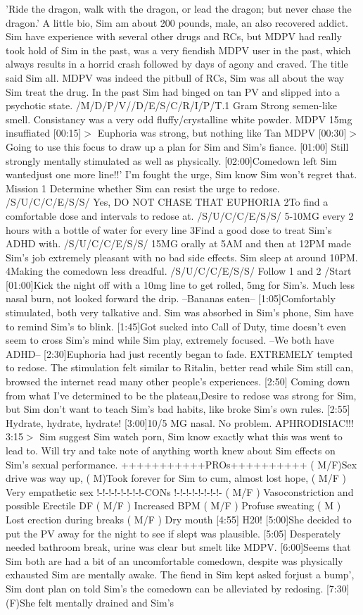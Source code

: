 \documentclass[12pt]{book}
\begin{document}
'Ride the dragon, walk with the dragon, or lead the dragon; but never chase the dragon.' A little bio, Sim am about 200 pounds, male, an also recovered addict. Sim have experience with several other drugs and RCs, but MDPV had really took hold of Sim in the past, was a very fiendish MDPV user in the past, which always results in a horrid crash followed by days of agony and craved. The title said Sim all. MDPV was indeed the pitbull of RCs, Sim was all about the way Sim treat the drug. In the past Sim had binged on tan PV and slipped into a psychotic state. /M/D/P/V//D/E/S/C/R/I/P/T.1 Gram Strong semen-like smell. Consistancy was a very odd fluffy/crystalline white powder. MDPV 15mg insuffiated [00:15]$>$ Euphoria was strong, but nothing like Tan MDPV [00:30]$>$Going to use this focus to draw up a plan for Sim and Sim's fiance. [01:00] Still strongly mentally stimulated as well as physically. [02:00]Comedown left Sim wantedjust one more line!!' I'm fought the urge, Sim know Sim won't regret that. Mission 1 Determine whether Sim can resist the urge to redose. /S/U/C/C/E/S/S/ Yes, DO NOT CHASE THAT EUPHORIA 2To find a comfortable dose and intervals to redose at. /S/U/C/C/E/S/S/ 5-10MG every 2 hours with a bottle of water for every line 3Find a good dose to treat Sim's ADHD with. /S/U/C/C/E/S/S/ 15MG orally at 5AM and then at 12PM made Sim's job extremely pleasant with no bad side effects. Sim sleep at around 10PM. 4Making the comedown less dreadful. /S/U/C/C/E/S/S/ Follow 1 and 2 /Start [01:00]Kick the night off with a 10mg line to get rolled, 5mg for Sim's. Much less nasal burn, not looked forward the drip. --Bananas eaten-- [1:05]Comfortably stimulated, both very talkative and. Sim was absorbed in Sim's phone, Sim have to remind Sim's to blink. [1:45]Got sucked into Call of Duty, time doesn't even seem to cross Sim's mind while Sim play, extremely focused. --We both have ADHD-- [2:30]Euphoria had just recently began to fade. EXTREMELY tempted to redose. The stimulation felt similar to Ritalin, better read while Sim still can, browsed the internet read many other people's experiences. [2:50] Coming down from what I've determined to be the plateau,Desire to redose was strong for Sim, but Sim don't want to teach Sim's bad habits, like broke Sim's own rules. [2:55] Hydrate, hydrate, hydrate! [3:00]10/5 MG nasal. No problem. APHRODISIAC!!! 3:15$>$ Sim suggest Sim watch porn, Sim know exactly what this was went to lead to. Will try and take note of anything worth knew about Sim effects on Sim's sexual performance. +++++++++++PROs++++++++++ ( M/F)Sex drive was way up, ( M)Took forever for Sim to cum, almost lost hope, ( M/F ) Very empathetic sex !-!-!-!-!-!-!-!-CONs !-!-!-!-!-!-!-!- ( M/F ) Vasoconstriction and possible Erectile DF ( M/F ) Increased BPM ( M/F ) Profuse sweating ( M ) Lost erection during breaks ( M/F ) Dry mouth [4:55] H20! [5:00]She decided to put the PV away for the night to see if slept was plausible. [5:05] Desperately needed bathroom break, urine was clear but smelt like MDPV. [6:00]Seems that Sim both are had a bit of an uncomfortable comedown, despite was physically exhausted Sim are mentally awake. The fiend in Sim kept asked forjust a bump', Sim dont plan on told Sim's the comedown can be alleviated by redosing. [7:30](F)She felt mentally drained and Sim's 
\end{document}

